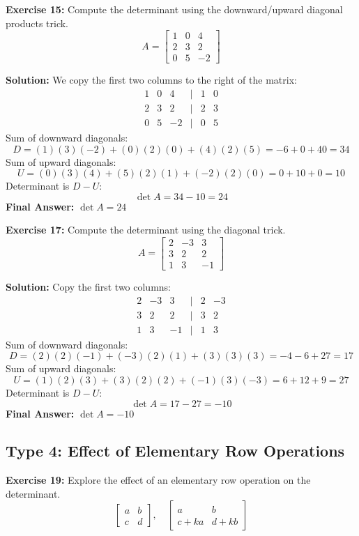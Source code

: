 \documentclass{article}
\begin{document}
\textbf{Exercise 15:} Compute the determinant using the downward/upward diagonal products trick.
\[ A = \begin{bmatrix} 1 & 0 & 4 \\ 2 & 3 & 2 \\ 0 & 5 & -2 \end{bmatrix} \]

\textbf{Solution:}
We copy the first two columns to the right of the matrix:
\[ \begin{matrix} 1 & 0 & 4 & | & 1 & 0 \\ 2 & 3 & 2 & | & 2 & 3 \\ 0 & 5 & -2 & | & 0 & 5 \end{matrix} \]
Sum of downward diagonals:
\[ D = (1)(3)(-2) + (0)(2)(0) + (4)(2)(5) = -6 + 0 + 40 = 34 \]
Sum of upward diagonals:
\[ U = (0)(3)(4) + (5)(2)(1) + (-2)(2)(0) = 0 + 10 + 0 = 10 \]
Determinant is $D - U$:
\[ \det A = 34 - 10 = 24 \]
\textbf{Final Answer:} $\det A = 24$

\vspace{0.5cm}
\textbf{Exercise 17:} Compute the determinant using the diagonal trick.
\[ A = \begin{bmatrix} 2 & -3 & 3 \\ 3 & 2 & 2 \\ 1 & 3 & -1 \end{bmatrix} \]

\textbf{Solution:}
Copy the first two columns:
\[ \begin{matrix} 2 & -3 & 3 & | & 2 & -3 \\ 3 & 2 & 2 & | & 3 & 2 \\ 1 & 3 & -1 & | & 1 & 3 \end{matrix} \]
Sum of downward diagonals:
\[ D = (2)(2)(-1) + (-3)(2)(1) + (3)(3)(3) = -4 - 6 + 27 = 17 \]
Sum of upward diagonals:
\[ U = (1)(2)(3) + (3)(2)(2) + (-1)(3)(-3) = 6 + 12 + 9 = 27 \]
Determinant is $D - U$:
\[ \det A = 17 - 27 = -10 \]
\textbf{Final Answer:} $\det A = -10$

\subsection{Type 4: Effect of Elementary Row Operations}

\textbf{Exercise 19:} Explore the effect of an elementary row operation on the determinant.
\[ \begin{bmatrix} a & b \\ c & d \end{bmatrix}, \quad \begin{bmatrix} a & b \\ c+ka & d+kb \end{bmatrix} \]
\end{document}
